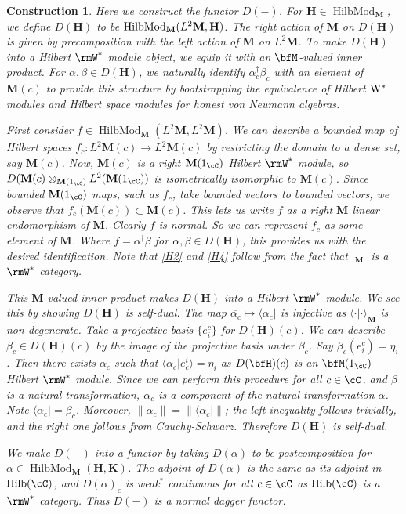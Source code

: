 \documentclass[11pt,reqno]{amsart}
\DeclareMathOperator{\Hilb}{Hilb}
\DeclareMathOperator{\WMod}{W^*Mod}
\DeclareMathOperator{\HilbMod}{HilbMod}
\newcommand{\bb}[1]{\mathbf{#1}}
\numberwithin{equation}{section}
\theoremstyle{plain}
\newtheorem{const}[thm]{Construction}
\begin{document}
\begin{const}
Here we construct the functor $D(-)$.
For $\bb H \in \HilbMod_{\bb M}$, we define $D(\bb H)$ to be $\HilbMod_{\bb M}(L^2\bb M, \bf H)$.
The right action of $\bb M$ on $D(\bb H)$ is given by precomposition with the left action of $\bb M$ on $L^2\bb M$.
To make $D(\bb H)$ into a Hilbert $\rmW^*$ module object, we equip it with an $\bfM$-valued inner product.
For $\alpha, \beta \in D(\bb H)$, we naturally identify $\alpha^\dagger_c \beta_c$ with an element of $\bb M(c)$ to provide this structure by bootstrapping the equivalence of Hilbert $\rm W^*$ modules and Hilbert space modules for \emph{honest} von Neumann algebras.

First consider $f \in \HilbMod_{\bb M} (L^2 \bb M, L^2 \bb M)$.
We can describe a bounded map of Hilbert spaces $f_c \colon L^2 \bb M(c) \to L^2 \bb M(c)$ by restricting the domain to a dense set, say $\bb M(c)$.
Now, $\bb M(c)$ is a right $\bb M(1_{\cC})$ Hilbert $\rmW^*$ module, so $D(\bb M(c) \otimes_{\bb M(1_{\cC})} L^2(\bb M(1_{\cC}))$ is isometrically isomorphic to $\bb M(c)$.
Since bounded $\bb M(1_{\cC})$ maps, such as $f_c$, take bounded vectors to bounded vectors, we observe that $f_c(\bb M(c)) \subset \bb M(c)$.
This lets us write $f$ as a right $\bb M$ linear endomorphism of $\bb M$.
Clearly $f$ is normal.
So we can represent $f_c$ as some element of $\bb M$.
Where $f = \alpha^\dagger \beta$ for $\alpha, \beta \in D(\bb H)$, this provides us with the desired identification.
Note that \ref{H2} and \ref{H4} follow from the fact that $\WMod_{\bb M}$ is a $\rmW^*$ category.

This $\bb M$-valued inner product makes $D(\bb H)$ into a Hilbert $\rmW^*$ module.
We see this by showing $D(\bb H)$ is self-dual.
The map $\overline{\alpha_c} \mapsto \langle \alpha_c|$ is injective as $\langle \cdot | \cdot \rangle_{\bb M}$ is non-degenerate.
Take a projective basis $\{e_i^c\}$ for $D(\bb H)(c)$.
We can describe $\beta_c \in D(\bb H)(c)$ by the image of the projective basis under $\beta_c$.
Say $\beta_c(e_i^c) = \eta_i$.
Then there exists $\alpha_c$ such that $\langle \alpha_c | e_c^i \rangle = \eta_i$ as $D(\bfH)(c)$ is an $\bfM(1_{\cC})$ Hilbert $\rmW^*$ module.
Since we can perform this procedure for all $c \in \cC$, and $\beta$ is a natural transformation, $\alpha_c$ is a component of the natural transformation $\alpha$.
Note $\langle \alpha_c | = \beta_c$.
Moreover, $\|\alpha_c\| = \|\langle \alpha_c| \|$; the left inequality follows trivially, and the right one follows from Cauchy-Schwarz.
Therefore $D(\bb H)$ is self-dual.

We make $D(-)$ into a functor by taking $D(\alpha)$ to be postcomposition for $\alpha \in \HilbMod_{\bb M}(\bb H, \bb K)$.
The adjoint of $D(\alpha)$ is the same as its adjoint in $\Hilb(\cC)$, and $D(\alpha)_c$ is weak$^*$ continuous for all $c \in \cC$ as $\Hilb(\cC)$ is a $\rmW^*$ category.
Thus $D(-)$ is a normal dagger functor.
\end{const}
\end{document}
